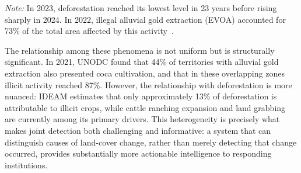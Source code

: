 \documentclass{article}
\begin{document}
\begin{table}[ht]
\centering
\caption{Trends in deforestation, coca cultivation, and illegal gold mining in Colombia}
\label{tab:quant}
\vspace{2mm}
\begin{flushleft}
\footnotesize
\textit{Note:} In 2023, deforestation reached its lowest level in 23 years before
rising sharply in 2024.
In 2022, illegal alluvial gold extraction (EVOA) accounted for 73\% of the total
area affected by this activity~\cite{infobae_evoa2023}.
\end{flushleft}
\end{table}

The relationship among these phenomena is not uniform but is structurally
significant.
In 2021, UNODC found that 44\% of territories with alluvial gold extraction also
presented coca cultivation, and that in these overlapping zones illicit activity
reached 87\%.
However, the relationship with deforestation is more nuanced: IDEAM estimates
that only approximately 13\% of deforestation is attributable to illicit crops,
while cattle ranching expansion and land grabbing are currently among its primary
drivers.
This heterogeneity is precisely what makes joint detection both challenging and
informative: a system that can distinguish causes of land-cover change, rather
than merely detecting that change occurred, provides substantially more actionable
intelligence to responding institutions.
\end{document}
